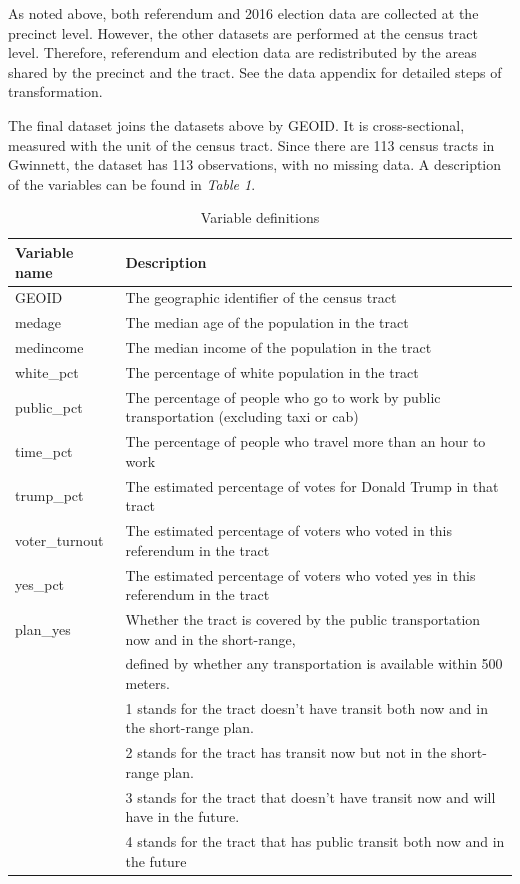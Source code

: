 \documentclass[
]{article}
\begin{document}
As noted above, both referendum and 2016 election data are collected at
the precinct level. However, the other datasets are performed at the
census tract level. Therefore, referendum and election data are
redistributed by the areas shared by the precinct and the tract. See the
data appendix for detailed steps of transformation.

The final dataset joins the datasets above by GEOID. It is
cross-sectional, measured with the unit of the census tract. Since there
are 113 census tracts in Gwinnett, the dataset has 113 observations,
with no missing data. A description of the variables can be found in
\emph{Table 1}.

\begin{table}
\centering
\caption{Variable definitions}
\label{variableDefinitions}
\begin{tabular}{ll}
\hline
\hline
Variable name      & Description                                   \\
\hline
GEOID          & The geographic identifier of the census tract                 \\
medage        & The median age of the population in the tract               \\
medincome        & The median income of the population in the tract               \\
white\_pct           & The percentage of white population in the tract      \\
public\_pct          & The percentage of people who go to work by public transportation (excluding taxi or cab)      \\
time\_pct           & The percentage of people who travel more than an hour to work      \\
trump\_pct          & The estimated percentage of votes for Donald Trump in that tract      \\
voter\_turnout  & The estimated percentage of voters who voted in this referendum in the tract \\
yes\_pct           & The estimated percentage of voters who voted yes in this referendum in the tract      \\
plan\_yes          & Whether the tract is covered by the public transportation now and in the short-range, \\ & defined by whether any transportation is available within 500 meters. \\ & 1 stands for the tract doesn't have transit both now and in the short-range plan. \\ & 2 stands for the tract has transit now but not in the short-range plan. \\ & 3 stands for the tract that doesn't have transit now and will have in the future.\\ & 4 stands for the tract that has public transit both now and in the future      \\

\hline
\end{tabular}
\end{table}
\end{document}

